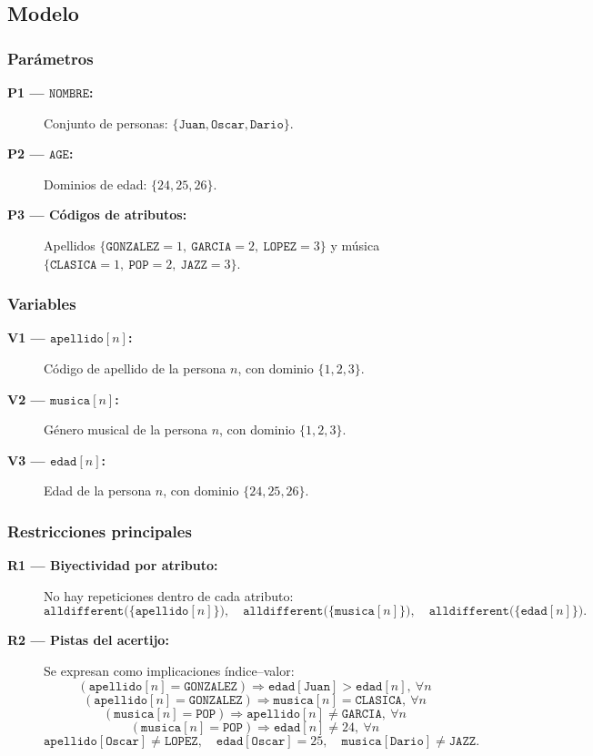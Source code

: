 
\subsection{Modelo}\label{sec:04-acertijo-logico-modelo}

\subsubsection*{Parámetros}
\begin{description}
  \item[\textbf{P1 — \(\texttt{NOMBRE}\):}] Conjunto de personas: \(\{\texttt{Juan},\texttt{Oscar},\texttt{Dario}\}\).
  \item[\textbf{P2 — \(\texttt{AGE}\):}] Dominios de edad: \(\{24,25,26\}\).
  \item[\textbf{P3 — Códigos de atributos:}] Apellidos \(\{\texttt{GONZALEZ}=1,\ \texttt{GARCIA}=2,\ \texttt{LOPEZ}=3\}\) y música \(\{\texttt{CLASICA}=1,\ \texttt{POP}=2,\ \texttt{JAZZ}=3\}\).
\end{description}

\subsubsection*{Variables}
\begin{description}
  \item[\textbf{V1 — \(\texttt{apellido}[n]\):}] Código de apellido de la persona \(n\), con dominio \(\{1,2,3\}\).
  \item[\textbf{V2 — \(\texttt{musica}[n]\):}] Género musical de la persona \(n\), con dominio \(\{1,2,3\}\).
  \item[\textbf{V3 — \(\texttt{edad}[n]\):}] Edad de la persona \(n\), con dominio \(\{24,25,26\}\).
\end{description}

\subsubsection*{Restricciones principales}
\begin{description}
  \item[\textbf{R1 — Biyectividad por atributo:}] No hay repeticiones dentro de cada atributo:
  \[
  \texttt{alldifferent}\big(\{\texttt{apellido}[n]\}\big),\quad
  \texttt{alldifferent}\big(\{\texttt{musica}[n]\}\big),\quad
  \texttt{alldifferent}\big(\{\texttt{edad}[n]\}\big).
  \]
  \item[\textbf{R2 — Pistas del acertijo:}] Se expresan como implicaciones índice–valor:
  \[
  (\texttt{apellido}[n]=\texttt{GONZALEZ})\Rightarrow \texttt{edad}[\texttt{Juan}]>\texttt{edad}[n],\ \forall n
  \]
  \[
  (\texttt{apellido}[n]=\texttt{GONZALEZ})\Rightarrow \texttt{musica}[n]=\texttt{CLASICA},\ \forall n
  \]
  \[
  (\texttt{musica}[n]=\texttt{POP})\Rightarrow \texttt{apellido}[n]\neq \texttt{GARCIA},\ \forall n
  \]
  \[
  (\texttt{musica}[n]=\texttt{POP})\Rightarrow \texttt{edad}[n]\neq 24,\ \forall n
  \]
  \[
  \texttt{apellido}[\texttt{Oscar}]\neq \texttt{LOPEZ},\quad
  \texttt{edad}[\texttt{Oscar}]=25,\quad
  \texttt{musica}[\texttt{Dario}]\neq \texttt{JAZZ}.
  \]
\end{description}

